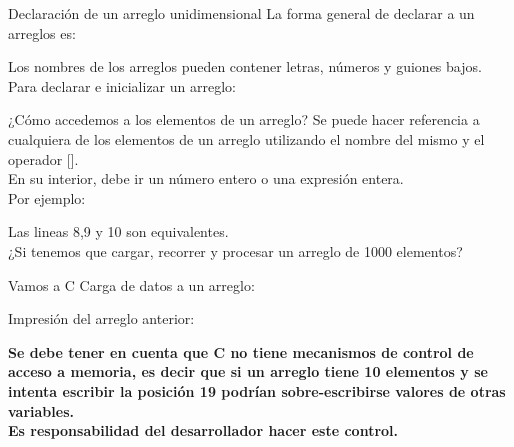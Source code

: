 \documentclass[xcolor=pdftex,table,11pt]{beamer}
\begin{document}
\begin{frame}{Declaración de un arreglo unidimensional}
La forma general de declarar a un arreglos es:

\codesetstylefrombeamer
{}

Los nombres de los arreglos pueden contener letras, números  y guiones bajos.\\

\vspace{0.5cm}
Para declarar e inicializar un arreglo:
\end{frame}



\begin{frame}{¿Cómo accedemos a los elementos de un arreglo?}
Se puede hacer referencia a cualquiera de los elementos de un arreglo  utilizando el nombre del mismo y el operador []. \\
En su interior, debe ir un número entero o una expresión entera. \\
Por ejemplo:

\codesetstylefrombeamer
{}

Las lineas 8,9 y 10 son equivalentes.\\

¿Si tenemos que cargar, recorrer y procesar un arreglo de 1000 elementos?
\end{frame}



\begin{frame}[allowframebreaks]{Vamos a C}
Carga de datos a un arreglo:
\codesetstylefrombeamer
{}

\newpage
Impresión del arreglo anterior:
\codesetstylefrombeamer
{}


\href{https://github.com/danis963/informaticaI_IUA/blob/main/c/src/8-array_load_print.c}{}

\textbf{Se debe tener en cuenta que C no tiene mecanismos de control de acceso a memoria, es decir que si un arreglo tiene 10 elementos y se intenta escribir la posición 19 podrían sobre-escribirse valores de otras variables. \\
Es responsabilidad del desarrollador hacer este control.}

\end{frame}
\end{document}
